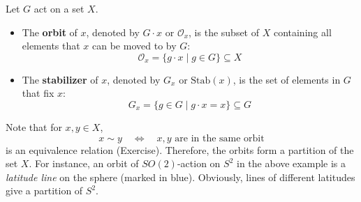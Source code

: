 \begin{definition}
Let $G$ act on a set $X$. 
\begin{itemize}
\item The \textbf{orbit} of $x$, denoted by $G \cdot x$ or $\mathcal{O}_x$, is the subset of $X$ containing all elements that $x$ can be moved to by $G$:
\[ \mathcal{O}_x = \{ g \cdot x \mid g \in G \} \subseteq X \]

\item The \textbf{stabilizer} of $x$, denoted by $G_x$ or $\text{Stab}(x)$, is the set of elements in $G$ that fix $x$:
\[ G_x = \{ g \in G \mid g \cdot x = x \} \subseteq G \]
\end{itemize}
\end{definition}
\begin{example}
Note that for $x ,y \in X$,
$$x \sim y  \quad \Leftrightarrow \quad x, y \text{ are in the same orbit}$$
is an equivalence relation (Exercise). Therefore, the orbits form a partition of the set $X$. For instance, an orbit of $SO(2)$-action on $S^2$ in the above example is a {\it latitude line}
on the sphere (marked in blue). Obviously, lines of different latitudes give a partition of $S^2$.
\end{example}


